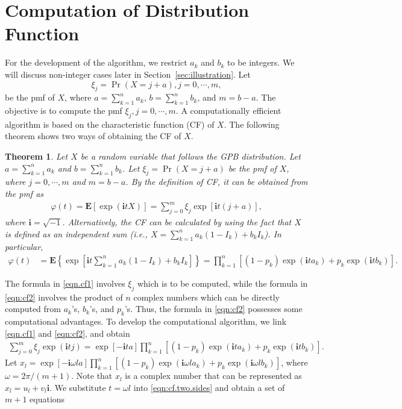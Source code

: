 \documentclass[12pt]{article}
\newcommand{\E}{\mathbf{E}}
\newcommand{\ivec}{{\boldsymbol{i}}}
\newtheorem{thm}{Theorem}
\begin{document}
\section{Computation of Distribution Function}\label{sec:algorithm.dev}
For the development of the algorithm, we restrict $a_k$ and $b_k$ to be integers. We will discuss non-integer cases later in Section~\ref{sec:illustration}. Let
$$\xi_j=\Pr(X=j+a), j=0,\cdots, m,$$
be the pmf of $X$, where $a=\sum_{k=1}^{n}a_k$, $b=\sum_{k=1}^{n}b_k$, and $m=b-a$. The objective is to compute the pmf $\xi_j, j=0, \cdots, m$. A computationally efficient algorithm is based on the characteristic function (CF) of $X$. The following theorem shows two ways of obtaining the CF of $X$.
\begin{thm}
Let $X$ be a random variable that follows the GPB distribution. Let $a=\sum_{k=1}^{n}a_k$ and $b=\sum_{k=1}^{n}b_k$. Let $\xi_j=\Pr(X=j+a)$ be the pmf of $X$, where $j=0,\cdots, m$ and $m=b-a$. By the definition of CF, it can be obtained from the pmf as
\begin{align}\label{eqn.cf1}
\varphi(t)=\E[\exp(\ivec tX)]=\sum_{j=0}^{m}\xi_{j}\exp[\ivec t(j+a)],
\end{align}
where $\ivec=\sqrt{-1}$.
Alternatively, the CF can be calculated by using the fact that $X$ is defined as an independent sum (i.e., $X=\sum_{k=1}^n a_k(1-I_k)+b_kI_k$). In particular,
\begin{align}\label{eqn:cf2}
\varphi(t)&=\E\left\{\exp\left[\ivec t\sum_{k=1}^n a_k(1-I_k)+b_kI_k\right]\right\}=\prod_{k=1}^n\left[(1-p_k)\exp(\ivec ta_k)+p_k\exp(\ivec tb_k)\right].
\end{align}
\end{thm}
The formula in \eqref{eqn.cf1} involves $\xi_{j}$ which is to be computed, while the formula in \eqref{eqn:cf2} involves the product of $n$ complex numbers which can be directly computed from $a_k$'s, $b_k$'s, and $p_k$'s. Thus, the formula in \eqref{eqn:cf2} possesses some computational advantages. To develop the computational algorithm, we link \eqref{eqn.cf1} and \eqref{eqn:cf2}, and obtain
\begin{align}\label{eqn:cf.two.sides}
\sum_{j=0}^{m}\xi_{j}\exp(\ivec tj)=\exp[-\ivec ta]\prod_{k=1}^n\left[(1-p_k)\exp(\ivec ta_k)+p_k\exp(\ivec tb_k)\right].
\end{align}
Let $x_l=\exp[-\ivec \omega la]\prod_{k=1}^n\left[(1-p_k)\exp(\ivec \omega la_k)+p_k\exp(\ivec \omega lb_k)\right]$, where $\omega=2\pi/(m+1)$. Note that $x_l$ is a complex number that can be represented as $x_l=u_l+v_l\ivec$.  We substitute $t=\omega l$ into \eqref{eqn:cf.two.sides} and obtain a set of $m+1$ equations
\end{document}
